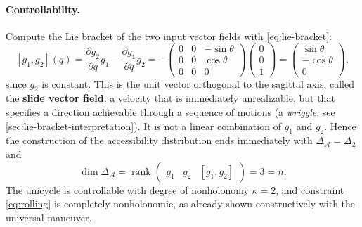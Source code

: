 \paragraph{Controllability.}
Compute the Lie bracket of the two input vector fields with
\cref{eq:lie-bracket}:
\[
[g_1, g_2](q) = \frac{\partial g_2}{\partial q} g_1
              - \frac{\partial g_1}{\partial q} g_2
              = - \begin{pmatrix}
                    0 & 0 & -\sin\theta \\
                    0 & 0 & \cos\theta \\
                    0 & 0 & 0
                  \end{pmatrix}
                  \begin{pmatrix} 0 \\ 0 \\ 1 \end{pmatrix}
              = \begin{pmatrix} \sin\theta \\ -\cos\theta \\ 0 \end{pmatrix},
\]
since \( g_2 \) is constant. This is the unit vector orthogonal to the
sagittal axis, called the \textbf{slide vector field}: a velocity that
is immediately unrealizable, but that specifies a direction achievable
through a sequence of motions (a \emph{wriggle}, see
\cref{sec:lie-bracket-interpretation}). It is not a linear combination
of \( g_1 \) and \( g_2 \). Hence
the construction of the accessibility distribution ends immediately
with \( \Delta_{\mathcal{A}} = \Delta_2 \) and
\[
\dim \Delta_{\mathcal{A}} = \operatorname{rank}
\begin{pmatrix} g_1 & g_2 & [g_1, g_2] \end{pmatrix} = 3 = n.
\]
The unicycle is controllable with degree of nonholonomy
\( \kappa = 2 \), and constraint \cref{eq:rolling} is completely
nonholonomic, as already shown constructively with the universal
maneuver.


